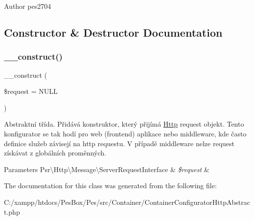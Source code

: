 \begin{DoxyAuthor}{Author}
pes2704 
\end{DoxyAuthor}


\subsection{Constructor \& Destructor Documentation}
\mbox{\label{class_pes_1_1_container_1_1_container_configurator_http_abstract_ad9fd33cd0f1d244412d6d6398a971dd8}} 
\subsubsection{\texorpdfstring{\+\_\+\+\_\+construct()}{\_\_construct()}}
{\footnotesize\ttfamily \+\_\+\+\_\+construct (\begin{DoxyParamCaption}\item[{Server\+Request\+Interface}]{\$request = {\ttfamily NULL} }\end{DoxyParamCaption})}

Abstraktní třída. Přidává konstruktor, který přijímá \mbox{\hyperlink{namespace_pes_1_1_http}{Http}} request objekt. Tento konfigurator se tak hodí pro web (frontend) aplikace nebo middleware, kde často definice služeb závisejí na http requestu. V případě middleware nelze request získávat z globálních proměnných.


\begin{DoxyParams}[1]{Parameters}
Psr\textbackslash{}\+Http\textbackslash{}\+Message\textbackslash{}\+Server\+Request\+Interface & {\em \$request} & \\
\hline
\end{DoxyParams}


The documentation for this class was generated from the following file\+:\begin{DoxyCompactItemize}
\item 
C\+:/xampp/htdocs/\+Pes\+Box/\+Pes/src/\+Container/Container\+Configurator\+Http\+Abstract.\+php\end{DoxyCompactItemize}

